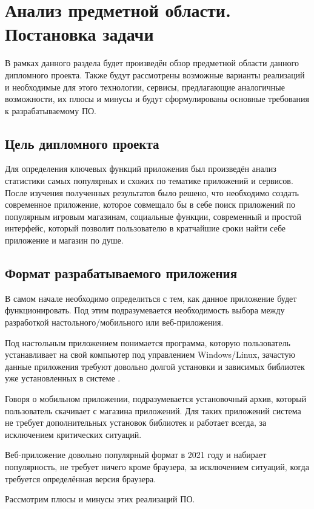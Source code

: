 \section{Анализ предметной области. Постановка задачи}
\label{sec:domain}

В рамках данного раздела будет произведён обзор предметной области данного дипломного проекта.
Также будут рассмотрены возможные варианты реализаций и необходимые для этого технологии, сервисы, предлагающие аналогичные возможности, их плюсы и минусы и будут сформулированы основные требования к разрабатываемому ПО.
 
\subsection{Цель дипломного проекта}
Для определения ключевых функций приложения был произведён анализ статистики самых популярных и схожих по тематике приложений и сервисов. После изучения полученных результатов было решено, что необходимо создать современное приложение, которое совмещало бы в себе поиск приложений по популярным игровым магазинам, социальные функции, современный и простой интерфейс, который позволит пользователю в кратчайшие сроки найти себе приложение и магазин по душе.

\subsection{Формат разрабатываемого приложения}
В самом начале необходимо определиться с тем, как данное приложение будет функционировать. Под этим подразумевается необходимость выбора между разработкой настольного/мобильного или веб-приложения.
 
Под настольным приложением понимается программа, которую пользователь устанавливает на свой компьютер под управлением Windows/Linux, зачастую данные приложения требуют довольно долгой установки и зависимых библиотек уже установленных в системе \cite{web1}.

Говоря о мобильном приложении, подразумевается установочный архив, который пользователь скачивает с магазина приложений. Для таких приложений система не требует дополнительных установок библиотек и работает всегда, за исключением критических ситуаций.

Веб-приложение довольно популярный формат в 2021 году и набирает популярность, не требует ничего кроме браузера, за исключением ситуаций, когда требуется определённая версия браузера.

Рассмотрим плюсы и минусы этих реализаций ПО.

